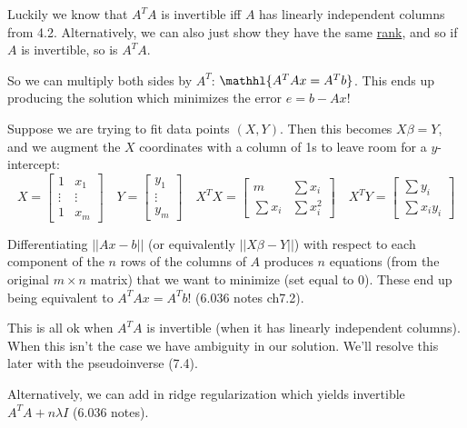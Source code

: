 \documentclass[12pt]{article} %
\begin{document}
Luckily we know that $A^TA$ is invertible iff $A$ has linearly independent columns from 4.2. Alternatively, we can also just show they have the same \href{https://math.stackexchange.com/questions/349738/prove-operatornamerankata-operatornameranka-for-any-a-in-m-m-times-n}{rank}, and so if $A$ is invertible, so is $A^TA$. 

So we can multiply both sides by $A^T$: $\mathhl{A^TAx = A^Tb}$. This ends up producing the solution which minimizes the error $e = b - Ax$!

Suppose we are trying to fit data points $(X,Y)$. Then this becomes $X \beta = Y$, and we augment the $X$ coordinates with a column of 1s to leave room for a $y$-intercept:
\begin{equation*}
    X = 
    \begin{bmatrix}
    1 & x_1 \\
    \vdots & \vdots \\
    1 & x_m
    \end{bmatrix}
    \quad
    Y = 
    \begin{bmatrix}
    y_1 \\
    \vdots \\
    y_m
    \end{bmatrix}
    \quad
    X^TX =
    \begin{bmatrix}
    m & \sum x_i \\
    \sum x_i & \sum x_i^2
    \end{bmatrix}
    \quad 
    X^TY =
    \begin{bmatrix}
    \sum y_i \\
    \sum x_i y_i
    \end{bmatrix}
\end{equation*}

Differentiating $||Ax-b||$ (or equivalently $||X\beta - Y||$) with respect to each component of the $n$ rows of the columns of $A$ produces $n$ equations (from the original $m \times n$ matrix) that we want to minimize (set equal to 0). These end up being equivalent to $A^TAx = A^Tb$! (6.036 notes ch7.2).

This is all ok when $A^TA$ is invertible (when it has linearly independent columns). When this isn't the case we have ambiguity in our solution. We'll resolve this later with the pseudoinverse (7.4).

Alternatively, we can add in ridge regularization which yields invertible $A^TA + n\lambda I$ (6.036 notes).


\newpage
\end{document}
